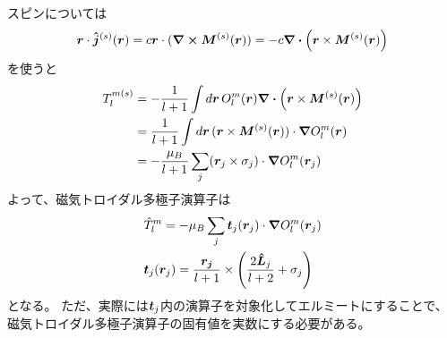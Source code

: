 \documentclass[../../master.tex]{subfiles}
\begin{document}
スピンについては
\begin{equation}
    \vb*{r}\cdot \vb*{\hat{j}}^{(s)}(\vb*{r}) = c\vb*{r}\cdot(\curl \vb*{M}^{(s)}(\vb*{r})) = -c\div(\vb*{r}\times \vb*{M}^{(s)}(\vb*{r}))
\end{equation}
を使うと
\begin{align}
    T_l^{m(s)}
    &= -\frac{1}{l+1} \int d\vb*{r}\, O_l^m(\vb*{r}) \div(\vb*{r}\times \vb*{M}^{(s)}(\vb*{r}))\\
    &= \frac{1}{l+1} \int d\vb*{r}\, (\vb*{r}\times \vb*{M}^{(s)}(\vb*{r}))\cdot \grad O_l^m(\vb*{r})\\
    &= -\frac{\mu_B}{l+1}\sum_j (\vb*{r}_j \times \sigma_j)\cdot \grad O_l^m(\vb*{r}_j)
\end{align}
よって、磁気トロイダル多極子演算子は
\begin{align}
    &\hat{T}_l^m = -\mu_B \sum_j \vb*{t}_j(\vb*{r}_j) \cdot \grad O_l^m(\vb*{r}_j)\\
    &\vb*{t}_j(\vb*{r}_j) = \frac{\vb*{r_j}}{l+1} \times \qty(\frac{2\vb*{\hat{L}}_j}{l+2}+\sigma_j)
\end{align}
となる。
ただ、実際には\(\vb*{t}_j\)内の演算子を対象化してエルミートにすることで、
磁気トロイダル多極子演算子の固有値を実数にする必要がある。


\end{document}

